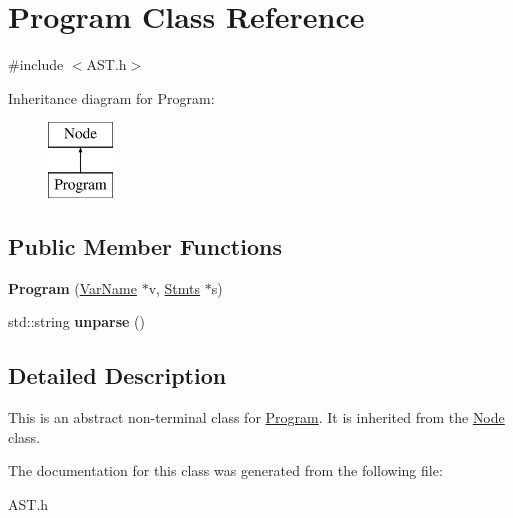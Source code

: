 \hypertarget{class_program}{}\section{Program Class Reference}
\label{class_program}


{\ttfamily \#include $<$A\+S\+T.\+h$>$}

Inheritance diagram for Program\+:\begin{figure}[H]
\begin{center}
\leavevmode
\includegraphics[height=2.000000cm]{class_program}
\end{center}
\end{figure}
\subsection*{Public Member Functions}
\begin{DoxyCompactItemize}
\item 
\hypertarget{class_program_aeacce1b9b363aaacb55a074e46a3dd5a}{}{\bfseries Program} (\hyperlink{class_var_name}{Var\+Name} $\ast$v, \hyperlink{class_stmts}{Stmts} $\ast$s)\label{class_program_aeacce1b9b363aaacb55a074e46a3dd5a}

\item 
\hypertarget{class_program_a33c78e36a63c63e5821b7747bec7b644}{}std\+::string {\bfseries unparse} ()\label{class_program_a33c78e36a63c63e5821b7747bec7b644}

\end{DoxyCompactItemize}


\subsection{Detailed Description}
This is an abstract non-\/terminal class for \hyperlink{class_program}{Program}. It is inherited from the \hyperlink{class_node}{Node} class. 

The documentation for this class was generated from the following file\+:\begin{DoxyCompactItemize}
\item 
A\+S\+T.\+h\end{DoxyCompactItemize}
